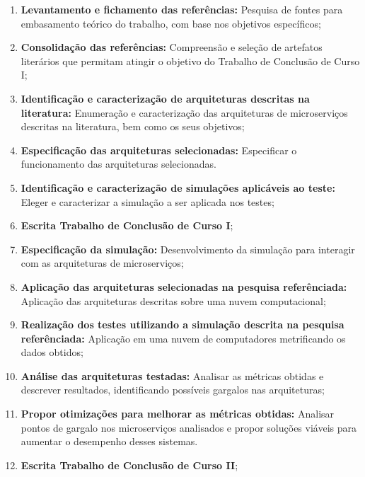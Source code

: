 \begin{enumerate}
  \item \textbf{Levantamento e fichamento das referências:} Pesquisa de fontes para embasamento teórico do trabalho, com base nos objetivos específicos;

  \item \textbf{Consolidação das referências:} Compreensão e seleção de artefatos literários que permitam atingir o objetivo do Trabalho de Conclusão de Curso I;

  \item \textbf{Identificação e caracterização de arquiteturas descritas na literatura:} Enumeração e caracterização das arquiteturas de microserviços descritas na literatura, bem como os seus objetivos;

  \item \textbf{Especificação das arquiteturas selecionadas:} Especificar o funcionamento das arquiteturas selecionadas.

  \item \textbf{Identificação e caracterização de simulações aplicáveis ao teste:} Eleger e caracterizar a simulação a ser aplicada nos testes;

  \item \textbf{Escrita Trabalho de Conclusão de Curso I};

  \item \textbf{Especificação da simulação:} Desenvolvimento da simulação para interagir com as arquiteturas de microserviços;

  \item \textbf{Aplicação das arquiteturas selecionadas na pesquisa referênciada:} Aplicação das arquiteturas descritas sobre uma nuvem computacional;

  \item \textbf{Realização dos testes utilizando a simulação descrita na pesquisa referênciada:} Aplicação em uma nuvem de computadores metrificando os dados obtidos;

  \item \textbf{Análise das arquiteturas testadas:} Analisar as métricas obtidas e descrever resultados, identificando possíveis gargalos nas arquiteturas;

  \item \textbf{Propor otimizações para melhorar as métricas obtidas:} Analisar pontos de gargalo nos microserviços analisados e propor soluções viáveis para aumentar o desempenho desses sistemas.

  \item \textbf{Escrita Trabalho de Conclusão de Curso II};
\end{enumerate}

